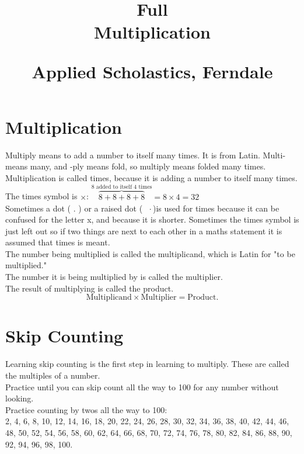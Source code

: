 \documentclass{article}
\author{}
\date{}
\title{Full\\Multiplication\\
\vspace{28pt}
\begin{normalsize}Applied Scholastics, Ferndale \end{normalsize}}
\begin{document}
\maketitle
\pagebreak
\tableofcontents
\pagebreak
\begin{spacing}{1.25}

\section{Multiplication}
Multiply means to add a number to itself many times. It is from Latin. Multi- means many, and -ply means fold, so multiply means folded many times.\\

Multiplication is called times, because it is adding a number to itself many times.\\

The times symbol is $\times$: 
$\overbrace{8+8+8+8}^{\textrm{8 added to itself 4 times}}= 8 \times 4 = 32$\\

Sometimes a dot ( . ) or a raised dot ($\text{ }\cdot$\text{ })is used for times because it can be confused for the letter x, and because it is shorter.
Sometimes the times symbol is just left out so if two things are next to each other in a maths statement it is assumed that times is meant.\\

The number being multiplied is called the multiplicand, which is Latin for "to be multiplied."\\

The number it is being multiplied by is called the multiplier.\\

The result of multiplying is called the product.
$$\text{Multiplicand}\times \text{Multiplier} = \text{Product.}$$

\newpage

\section{Skip Counting}
Learning skip counting is the first step in learning to multiply. These are called the multiples of a number.\\

Practice until you can skip count all the way to 100 for any number without looking.\\

Practice counting by twos all the way to 100:\\
2, 4, 6, 8, 10, 12, 14, 16, 18, 20, 22, 24, 26, 28, 30, 32, 34, 36, 38, 40, 42, 44, 46, 48, 50, 52, 54, 56, 58, 60, 62, 64, 66, 68, 70, 72, 74, 76, 78, 80, 82, 84, 86, 88, 90, 92, 94, 96, 98, 100.


\end{spacing}
\end{document}
